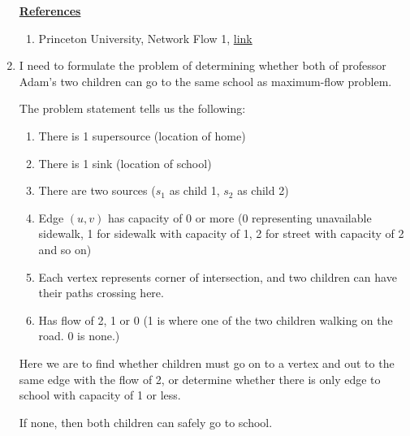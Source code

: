 \documentclass[12pt]{article}
\begin{document}
\begin{enumerate}[1.]
\begin{itemize}
\begin{itemize}
        \end{itemize}
    \end{itemize}

    \bigskip

    \underline{\textbf{References}}

    \bigskip

    \begin{enumerate}[1)]
        \item Princeton University, Network Flow 1, \href{https://www.cs.princeton.edu/~wayne/kleinberg-tardos/pdf/07NetworkFlowI.pdf}{link}
    \end{enumerate}

    \item

    \bigskip

    I need to formulate the problem of determining whether both of professor Adam's two children can go to the same school
    as maximum-flow problem.

    \bigskip

    The problem statement tells us the following:

    \bigskip

    \begin{enumerate}[1.]
        \item There is 1 supersource (location of home)
        \item There is 1 sink (location of school)
        \item There are two sources ($s_1$ as child 1, $s_2$ as child 2)
        \item Edge $(u,v)$ has capacity of 0 or more (0 representing unavailable sidewalk, 1 for sidewalk with capacity of 1, 2 for street with capacity of 2 and so on)
        \item Each vertex represents corner of intersection, and two children can have their paths crossing here.
        \item Has flow of 2, 1 or 0 (1 is where one of the two children walking on the road. 0 is none.)
    \end{enumerate}

    \bigskip

    Here we are to find whether children must go on to a vertex and out to the same edge with the flow of 2,
    or determine whether there is only edge to school with capacity of 1 or less.

    \bigskip

    If none, then both children can safely go to school.


\end{enumerate}
\end{document}
